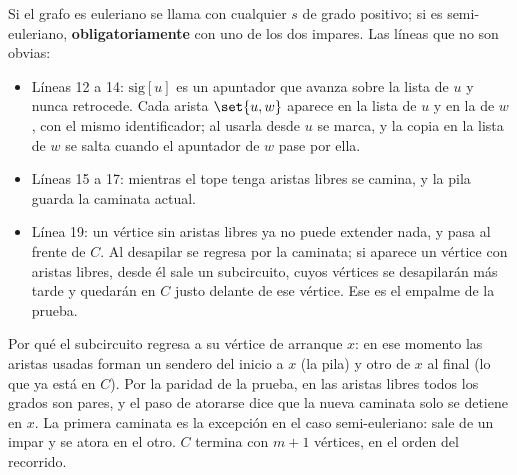 \documentclass[11pt,letterpaper]{article}
\begin{document}
Si el grafo es euleriano se llama con cualquier $s$ de grado positivo;
si es semi-euleriano, \textbf{obligatoriamente} con uno de los dos
impares. Las líneas que no son obvias:
\begin{itemize}[itemsep=0.1em]
  \item Líneas 12 a 14: $\text{sig}[u]$ es un apuntador que avanza
        sobre la lista de $u$ y nunca retrocede. Cada arista
        $\set{u, w}$ aparece en la lista de $u$ y en la de $w$, con el
        mismo identificador; al usarla desde $u$ se marca, y la copia
        en la lista de $w$ se salta cuando el apuntador de $w$ pase por
        ella.
  \item Líneas 15 a 17: mientras el tope tenga aristas libres se
        camina, y la pila guarda la caminata actual.
  \item Línea 19: un vértice sin aristas libres ya no puede extender
        nada, y pasa al frente de $C$. Al desapilar se regresa por la
        caminata; si aparece un vértice con aristas libres, desde él
        sale un subcircuito, cuyos vértices se desapilarán más tarde y
        quedarán en $C$ justo delante de ese vértice. Ese es el empalme
        de la prueba.
\end{itemize}
Por qué el subcircuito regresa a su vértice de arranque $x$: en ese
momento las aristas usadas forman un sendero del inicio a $x$ (la
pila) y otro de $x$ al final (lo que ya está en $C$). Por la paridad
de la prueba, en las aristas libres todos los grados son pares, y el
paso de atorarse dice que la nueva caminata solo se detiene en $x$.
La primera caminata es la excepción en el caso semi-euleriano: sale
de un impar y se atora en el otro.
$C$ termina con $m + 1$ vértices, en el orden del recorrido.
\end{document}
